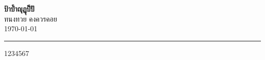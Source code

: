 \documentclass[a4paper, 12pt]{article}
\theoremstyle{plain} %
\begin{document}
\thispagestyle{plain}
\begin{center}
{\Large\textbf{ป้าป้ำญุฏุป็ปั}}\\
ทนงทวย คงควรคอย\\
\today
\end{center}
\abstract{}
\tableofcontents
\hrule
\vspace{12pt}
1234567
\end{document}

